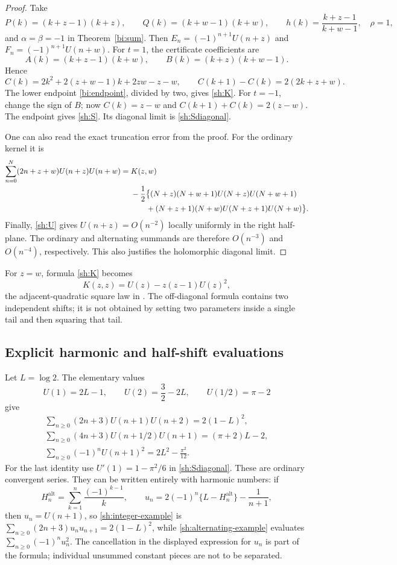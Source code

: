 \documentclass[11pt,letterpaper]{article}
\numberwithin{equation}{section}
\theoremstyle{definition}
\theoremstyle{remark}
\begin{document}
\begin{proof}
Take
\[
 P(k)=(k+z-1)(k+z),\qquad Q(k)=(k+w-1)(k+w),
 \qquad h(k)=\frac{k+z-1}{k+w-1},\quad\rho=1,
\]
and $\alpha=\beta=-1$ in Theorem~\ref{bi:sum}. Then
$E_n=(-1)^{n+1}U(n+z)$ and $F_n=(-1)^{n+1}U(n+w)$.
For $t=1$, the certificate coefficients are
\[
 A(k)=(k+z-1)(k+w),\qquad B(k)=(k+z)(k+w-1).
\]
Hence
\[
 C(k)=2k^2+2(z+w-1)k+2zw-z-w,\qquad
 C(k+1)-C(k)=2(2k+z+w).
\]
The lower endpoint \eqref{bi:endpoint}, divided by two, gives
\eqref{sh:K}. For $t=-1$, change the sign of $B$; now
$C(k)=z-w$ and $C(k+1)+C(k)=2(z-w)$.
The endpoint gives \eqref{sh:S}. Its diagonal limit is
\eqref{sh:Sdiagonal}.

One can also read the exact truncation error from the proof. For the
ordinary kernel it is
\begin{align}\label{sh:finite-endpoint}
 \sum_{n=0}^N(2n+z+w)U(n+z)U(n+w)
 ={}&K(z,w)\notag\\
 &-\frac12\bigl\{(N+z)(N+w+1)U(N+z)U(N+w+1)\notag\\
 &\qquad +(N+z+1)(N+w)U(N+z+1)U(N+w)\bigr\}.
\end{align}
Finally, \eqref{sh:U} gives $U(n+z)=O(n^{-2})$ locally uniformly
in the right half-plane. The ordinary and alternating summands are
therefore $O(n^{-3})$ and $O(n^{-4})$, respectively. This also
justifies the holomorphic diagonal limit.
\end{proof}

For $z=w$, formula \eqref{sh:K} becomes
\[
 K(z,z)=U(z)-z(z-1)U(z)^2,
\]
the adjacent-quadratic square law in \cite{tail-alternating}.
The off-diagonal formula contains two independent shifts; it is not
obtained by setting two parameters inside a single tail and then
squaring that tail.

\subsection{Explicit harmonic and half-shift evaluations}

Let $L=\log2$. The elementary values
\[
 U(1)=2L-1,\qquad U(2)=\frac32-2L,\qquad
 U(1/2)=\pi-2
\]
give
\begin{align}
 \boxed{\sum_{n\ge0}(2n+3)U(n+1)U(n+2)=2(1-L)^2,}
       \label{sh:integer-example}\\
 \boxed{\sum_{n\ge0}(4n+3)U(n+1/2)U(n+1)=(\pi+2)L-2,}
       \label{sh:half-example}\\
 \boxed{\sum_{n\ge0}(-1)^nU(n+1)^2=2L^2-\frac{\pi^2}{12}.}
       \label{sh:alternating-example}
\end{align}
For the last identity use $U'(1)=1-\pi^2/6$ in
\eqref{sh:Sdiagonal}. These are ordinary convergent series.
They can be written entirely with harmonic numbers: if
\[
 H_n^{\mathrm{alt}}=\sum_{k=1}^n\frac{(-1)^{k-1}}k,
 \qquad u_n=2(-1)^n\{L-H_n^{\mathrm{alt}}\}-\frac1{n+1},
\]
then $u_n=U(n+1)$, so \eqref{sh:integer-example} is
$\sum_{n\ge0}(2n+3)u_nu_{n+1}=2(1-L)^2$, while
\eqref{sh:alternating-example} evaluates $\sum_{n\ge0}(-1)^nu_n^2$.
The cancellation in the displayed expression for $u_n$ is part of
the formula; individual unsummed constant pieces are not to be separated.
\end{document}
